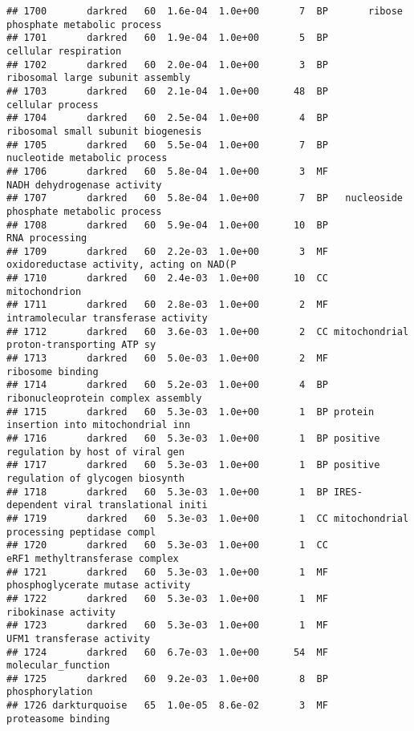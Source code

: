 \documentclass[]{article}
\begin{document}
\begin{verbatim}
## 1700       darkred   60  1.6e-04  1.0e+00       7  BP       ribose phosphate metabolic process
## 1701       darkred   60  1.9e-04  1.0e+00       5  BP                     cellular respiration
## 1702       darkred   60  2.0e-04  1.0e+00       3  BP         ribosomal large subunit assembly
## 1703       darkred   60  2.1e-04  1.0e+00      48  BP                         cellular process
## 1704       darkred   60  2.5e-04  1.0e+00       4  BP       ribosomal small subunit biogenesis
## 1705       darkred   60  5.5e-04  1.0e+00       7  BP             nucleotide metabolic process
## 1706       darkred   60  5.8e-04  1.0e+00       3  MF              NADH dehydrogenase activity
## 1707       darkred   60  5.8e-04  1.0e+00       7  BP   nucleoside phosphate metabolic process
## 1708       darkred   60  5.9e-04  1.0e+00      10  BP                           RNA processing
## 1709       darkred   60  2.2e-03  1.0e+00       3  MF oxidoreductase activity, acting on NAD(P
## 1710       darkred   60  2.4e-03  1.0e+00      10  CC                            mitochondrion
## 1711       darkred   60  2.8e-03  1.0e+00       2  MF      intramolecular transferase activity
## 1712       darkred   60  3.6e-03  1.0e+00       2  CC mitochondrial proton-transporting ATP sy
## 1713       darkred   60  5.0e-03  1.0e+00       2  MF                         ribosome binding
## 1714       darkred   60  5.2e-03  1.0e+00       4  BP       ribonucleoprotein complex assembly
## 1715       darkred   60  5.3e-03  1.0e+00       1  BP protein insertion into mitochondrial inn
## 1716       darkred   60  5.3e-03  1.0e+00       1  BP positive regulation by host of viral gen
## 1717       darkred   60  5.3e-03  1.0e+00       1  BP positive regulation of glycogen biosynth
## 1718       darkred   60  5.3e-03  1.0e+00       1  BP IRES-dependent viral translational initi
## 1719       darkred   60  5.3e-03  1.0e+00       1  CC mitochondrial processing peptidase compl
## 1720       darkred   60  5.3e-03  1.0e+00       1  CC           eRF1 methyltransferase complex
## 1721       darkred   60  5.3e-03  1.0e+00       1  MF         phosphoglycerate mutase activity
## 1722       darkred   60  5.3e-03  1.0e+00       1  MF                      ribokinase activity
## 1723       darkred   60  5.3e-03  1.0e+00       1  MF                UFM1 transferase activity
## 1724       darkred   60  6.7e-03  1.0e+00      54  MF                       molecular_function
## 1725       darkred   60  9.2e-03  1.0e+00       8  BP                          phosphorylation
## 1726 darkturquoise   65  1.0e-05  8.6e-02       3  MF                       proteasome binding

\end{verbatim}
\end{document}
